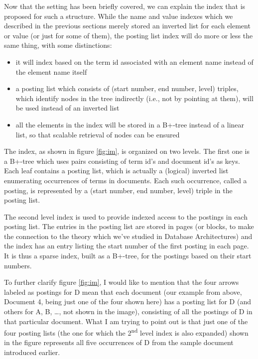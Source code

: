 \documentclass[a4paper,10pt]{article}
\begin{document}
Now that the setting has been briefly covered, we can explain the index that is proposed
for such a structure. While the name and value indexes which we described in the previous
sections merely stored an inverted list for each element or value  (or just for some of them),
the posting list index will do more or less the same thing, with some distinctions:

\begin{itemize}
\item it will index based on the term id associated with an element name instead of the
element name itself
\item a posting list which consists of (start number, end number, level) triples, which
identify nodes in the tree indirectly (i.e., not by pointing at them), will be used instead
of an inverted list \item all the elements in the index will be stored in a B+-tree instead
of a linear list, so that scalable retrieval of nodes can be ensured
\end{itemize}

The index, as shown in figure \ref{fig:im}, is organized on two levels. The first one is a B+-tree
which uses pairs consisting of term id's and document id's as keys. Each leaf contains a
posting list, which is actually a (logical) inverted list enumerating occurrences of terms in
documents. Each such occurrence, called a posting, is represented by a (start number, end
number, level) triple in the posting list.

The second level index is used to provide indexed access to the postings in each posting list.
The entries in the posting list are stored in pages (or blocks, to make the connection to the
theory which we've studied in Database Architectures) and the index has an entry listing
the start number of the first posting in each page. It is thus a sparse index, built as a B+-tree,
for the postings based on their start numbers.

To further clarify figure \ref{fig:im}, I would like to mention that the four arrows labeled
as postings for D mean that each document (our example from above, Document 4, being
just one of the four shown here) has a posting list for D (and others for A, B, \ldots, not shown
in the image), consisting of all the postings of D in that particular document. What I am
trying to point out is that just one of the four posting lists (the one for which the
2\textsuperscript{nd} level index is also expanded) shown in the figure represents all
five occurrences of D from the sample document introduced earlier.
\end{document}
